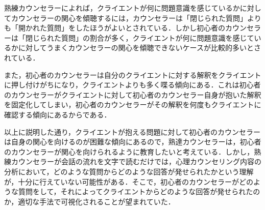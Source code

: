 \documentclass[shuuron]{kuee}
\begin{document}
熟練カウンセラーによれば，クライエントが何に問題意識を感じているかに対してカウンセラーの関心を傾聴するには，カウンセラーは「閉じられた質問」よりも「開かれた質問」をしたほうがよいとされている\cite{ivey}．しかし初心者のカウンセラーは「閉じられた質問」の割合が多く，クライエントが何に問題意識を感じているかに対してうまくカウンセラーの関心を傾聴できないケースが比較的多いとされている．


また，初心者のカウンセラーは自分のクライエントに対する解釈をクライエントに押し付けがちになり，クライエントよりも多く喋る傾向にある．これは初心者のカウンセラーがクライエントに対して初心者のカウンセラー自身が抱いた解釈を固定化してしまい，初心者のカウンセラーがその解釈を何度もクライエントに確認する傾向にあるからである．

以上に説明した通り，クライエントが抱える問題に対して初心者のカウンセラーは自身の関心を向けるのが困難な傾向にあるので，熟達カウンセラーは，初心者のカウンセラーが関心を向けられるように教育したいと考えている．しかし，熟練カウンセラーが会話の流れを文字で読むだけでは，心理カウンセリング内容の分析において，どのような質問からどのような回答が発せられたかという理解が，十分に行えていない可能性がある．そこで，初心者のカウンセラーがどのような質問をして，それによってクライエントからどのような回答が発せられたのか，適切な手法で可視化されることが望まれていた．

\end{document}

